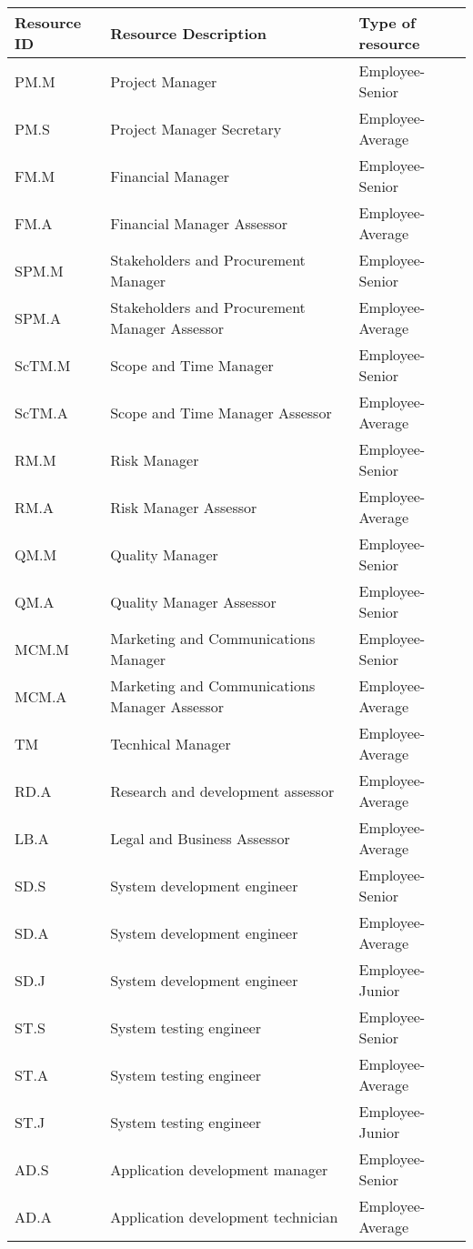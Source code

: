 \begin{longtable}{lll}
	
\toprule[2pt]

\textbf{Resource ID} & \textbf{Resource Description} & \textbf{Type of resource}  
		\\ \midrule[1.5pt] 
	
PM.M&Project Manager&Employee-Senior\\
PM.S&Project Manager Secretary&Employee-Average\\
FM.M&Financial Manager&Employee-Senior\\
FM.A&Financial Manager Assessor&Employee-Average\\
SPM.M&Stakeholders and Procurement Manager&Employee-Senior\\
SPM.A&Stakeholders and Procurement Manager Assessor&Employee-Average\\
ScTM.M&Scope and Time Manager&Employee-Senior\\
ScTM.A&Scope and Time Manager Assessor&Employee-Average\\
RM.M&Risk Manager&Employee-Senior\\
RM.A&Risk Manager Assessor&Employee-Average\\
QM.M&Quality Manager&Employee-Senior\\
QM.A&Quality Manager Assessor&Employee-Senior\\
MCM.M&Marketing and Communications Manager&Employee-Senior\\
MCM.A&Marketing and Communications Manager Assessor&Employee-Average\\
TM&Tecnhical Manager&Employee-Average\\
RD.A&Research and development assessor&Employee-Average\\
LB.A&Legal and Business Assessor&Employee-Average\\
SD.S&System development engineer&Employee-Senior\\
SD.A&System development engineer&Employee-Average\\
SD.J&System development engineer&Employee-Junior\\
ST.S&System testing engineer&Employee-Senior\\
ST.A&System testing engineer&Employee-Average\\
ST.J&System testing engineer&Employee-Junior\\
AD.S&Application development manager&Employee-Senior\\
AD.A&Application development technician&Employee-Average\\

\end{longtable}
